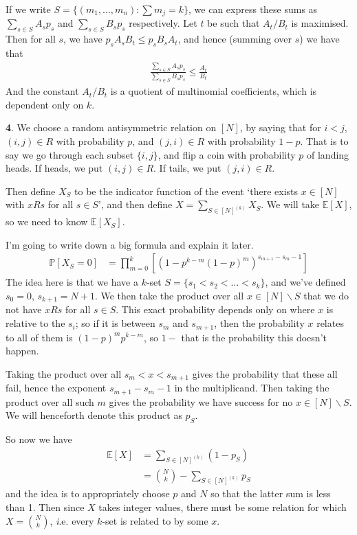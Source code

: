 \documentclass[]{article}
\theoremstyle{custhm}
\theoremstyle{cusdef}
\theoremstyle{custhm}
\theoremstyle{custhm}
\theoremstyle{custhm}
\theoremstyle{custhm}
\theoremstyle{cusdef}
\theoremstyle{remark}
\newcommand{\E}{\mathbb{E}}
\renewcommand{\P}{\mathbb{P}}
\renewcommand{\it}[1]{\textit{#1}}
\begin{document}
If we write $S = \{(m_1,\dots,m_n): \sum m_j = k\}$, we can express these sums as $\sum_{s\in S} A_s p_s$ and $\sum_{s\in S}B_s p_s$ respectively. Let $t$ be such that $A_t/B_t$ is maximised. Then for all $s$, we have $p_sA_sB_t \le p_sB_sA_t$, and hence (summing over $s$) we have that
\begin{align*}
\frac{\sum_{s\in S}A_s p_s}{\sum_{s\in S}B_sp_s} \le \frac{A_t}{B_t}
\end{align*}
And the constant $A_t/B_t$ is a quotient of multinomial coefficients, which is dependent only on $k$.


\textbf{4}. We choose a random antisymmetric relation on $[N]$, by saying that for $i < j$, $(i,j)\in R$ with probability $p$, and $(j,i)\in R$ with probability $1-p$. That is to say we go through each subset $\{i,j\}$, and flip a coin with probability $p$ of landing heads. If heads, we put $(i,j)\in R$. If tails, we put $(j,i)\in R$.

Then define $X_{S}$ to be the indicator function of the event `there exists $x\in [N]$ with $xRs$ for all $s\in S$', and then define $X = \sum_{S\in [N]^{(k)}} X_{S}$. We will take $\E[X]$, so we need to know $\E [X_{S}]$.

I'm going to write down a big formula and explain it later.
\begin{align*}
\P[X_S = 0] &= \prod_{m=0}^{k}\left[(1-p^{k-m}(1-p)^{m})^{s_{m+1}-s_m-1}\right]
\end{align*}
The idea here is that we have a $k$-set $S = \{s_1<s_2<\dots<s_k\}$, and we've defined $s_0 = 0$, $s_{k+1} = N+1$. We then take the product over all $x\in [N]\backslash S$ that we do not have $xRs$ for all $s\in S$. This exact probability depends only on where $x$ is relative to the $s_i$; so if it is between $s_m$ and $s_{m+1}$, then the probability $x$ relates to all of them is $(1-p)^{m}p^{k-m}$, so $1 -$ that is the probability this doesn't happen.

Taking the product over all $s_m < x < s_{m+1}$ gives the probability that these all fail, hence the exponent $s_{m+1}-s_m - 1$ in the multiplicand. Then taking the product over all such $m$ gives the probability we have success for no $x \in [N]\backslash S$. We will henceforth denote this product as $p_S$.

So now we have
\begin{align*}
\E[X] &= \sum_{S\in [N]^{(k)}}(1-p_S)\\
&=\binom{N}{k} - \sum_{S\in [N]^{(k)}}p_S
\end{align*}
and the idea is to appropriately choose $p$ and $N$ so that the latter sum is less than 1. Then since $X$ takes integer values, there must be some relation for which $X = \binom{N}{k}$, {\it i.e.} every $k$-set is related to by some $x$.
\end{document}

